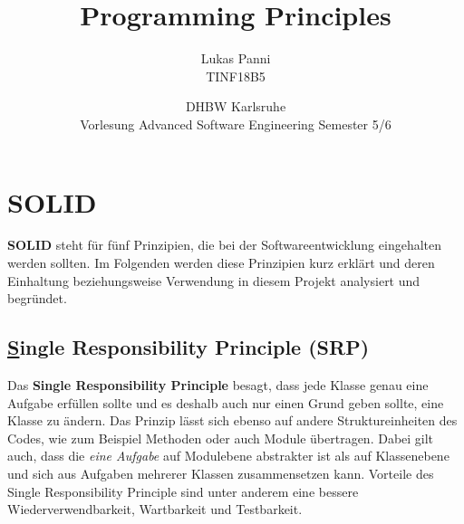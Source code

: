 \documentclass[12pt]{article}
\title{Programming Principles}
\date{DHBW Karlsruhe\\ Vorlesung Advanced Software Engineering Semester 5/6}
\author{Lukas Panni \\ TINF18B5}
\begin{document}
\maketitle

\newpage

\tableofcontents

\newpage
\section{SOLID}

\textbf{SOLID} steht für fünf Prinzipien, die bei der Softwareentwicklung eingehalten werden sollten. 
Im Folgenden werden diese Prinzipien kurz erklärt und deren Einhaltung beziehungsweise Verwendung in diesem Projekt analysiert und begründet.


\subsection{\underline{S}ingle Responsibility Principle (SRP)}

Das \textbf{Single Responsibility Principle} besagt, dass jede Klasse genau eine Aufgabe erfüllen sollte und es deshalb auch nur einen Grund geben sollte, eine Klasse zu ändern.
Das Prinzip lässt sich ebenso auf andere Struktureinheiten des Codes, wie zum Beispiel Methoden oder auch Module übertragen.
Dabei gilt auch, dass die \textit{eine Aufgabe} auf Modulebene abstrakter ist als auf Klassenebene und sich aus Aufgaben mehrerer Klassen zusammensetzen kann.
\newline
Vorteile des Single Responsibility Principle sind unter anderem eine bessere Wiederverwendbarkeit, Wartbarkeit  und Testbarkeit.
\end{document}
